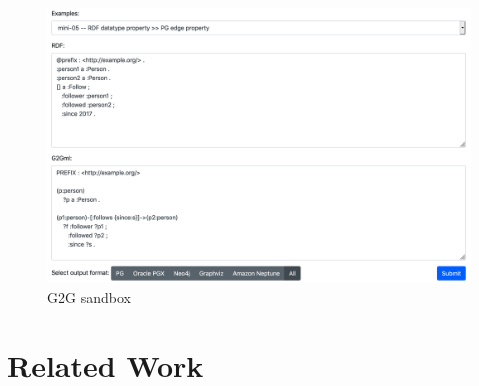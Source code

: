 \documentclass[runningheads]{llncs}
\begin{document}
\begin{figure}
\center
\includegraphics[width=1.0\textwidth]{sandbox.png}
\caption{G2G sandbox}
\label{fig:sandbox}
\end{figure}




\section{Related Work}
\end{document}
